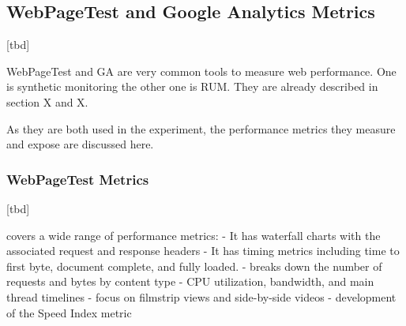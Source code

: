 
\subsection{WebPageTest and Google Analytics Metrics}

[tbd]

WebPageTest and GA are very common tools to measure web performance.
One is synthetic monitoring the other one is RUM.
They are already described in section X and X.

As they are both used in the experiment, the performance metrics they measure and expose are discussed here.



\subsubsection{WebPageTest Metrics}

[tbd]


covers a wide range of performance metrics:
- It has waterfall charts with the associated request and response headers
- It has timing metrics including time to first byte, document complete, and fully loaded.
- breaks down the number of requests and bytes by content type
- CPU utilization, bandwidth, and main thread timelines
- focus on filmstrip views and side-by-side videos
- development of the Speed Index metric












